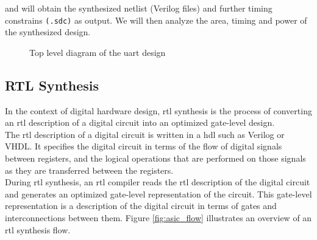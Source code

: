 \documentclass[a4paper,11pt]{article}%
\begin{document}
and will obtain the synthesized netlist (Verilog files) and further timing constrains {\tt (.sdc)} as output. We will then analyze the area, timing and power of the synthesized design.

\begin{figure}[h]
	\centering
	\caption{Top level diagram of the \ac{uart} design}
	\label{fig:top_level}
\end{figure}

\pagebreak
\subsection{RTL Synthesis}

In the context of digital hardware design, \ac{rtl} synthesis is the process of converting an \ac{rtl} description of a digital circuit into an optimized gate-level design.\\

The \ac{rtl} description of a digital circuit is written in a \ac{hdl} such as Verilog or VHDL. It specifies the digital circuit in terms of the flow of digital signals between registers, and the logical operations that are performed on those signals as they are transferred between the registers.\\

During \ac{rtl} synthesis, an \ac{rtl} compiler reads the \ac{rtl} description of the digital circuit and generates an optimized gate-level representation of the circuit. This gate-level representation is a description of the digital circuit in terms of gates and interconnections between them. Figure \ref{fig:asic_flow} illustrates an overview of an \ac{rtl} synthesis flow.

\vfill
\end{document}
